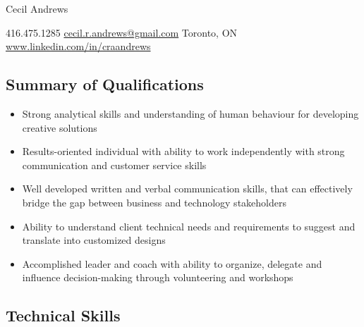 \documentclass{article}
\begin{document}
\begin{center}
   
    \Huge\textcolor{ablue}{Cecil Andrews}

\end{center}

\begin{center}
 
416.475.1285 \vert  \href{mailto:cecil.r.andrews@gmail.com}{cecil.r.andrews@gmail.com} \vert  Toronto, ON \vert \href{www.linkedin.com/in/craandrews}{www.linkedin.com/in/craandrews}

\end{center}

\begin{center}
\section*{Summary of Qualifications}
\end{center}


\begin{flushleft}
\begin{itemize}
\item Strong analytical skills and understanding of human behaviour for developing creative solutions\\
\item Results-oriented individual with ability to work independently with strong communication and customer service skills \\
\item Well developed written and verbal communication skills, that can effectively bridge the gap between business and technology stakeholders \\
\item Ability to understand client technical needs and requirements to suggest and translate into customized designs\\
\item Accomplished leader and  coach with ability to organize, delegate and influence decision-making through volunteering and workshops
\end{itemize}
\end{flushleft}

\begin{center}
\section*{Technical Skills}
\end{center}
\end{document}
